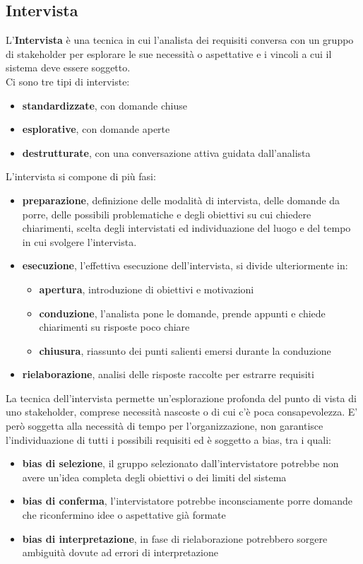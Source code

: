 \subsection{Intervista}\label{intervista}
L'\textbf{Intervista} è una tecnica in cui l'analista dei requisiti conversa con un gruppo di stakeholder per esplorare le sue necessità o aspettative e i vincoli a cui il sistema deve essere soggetto. \\
Ci sono tre tipi di interviste:
\begin{itemize}
    \item \textbf{standardizzate}, con domande chiuse
    \item \textbf{esplorative}, con domande aperte
    \item \textbf{destrutturate}, con una conversazione attiva guidata dall'analista
\end{itemize}
L'intervista si compone di più fasi:
\begin{itemize}
    \item \textbf{preparazione}, definizione delle modalità di intervista, delle domande da porre, delle possibili problematiche e degli obiettivi su cui chiedere chiarimenti, scelta degli intervistati ed individuazione del luogo e del tempo in cui svolgere l'intervista.
    \item \textbf{esecuzione}, l'effettiva esecuzione dell'intervista, si divide ulteriormente in:
    \begin{itemize}
        \item \textbf{apertura}, introduzione di obiettivi e motivazioni
        \item \textbf{conduzione}, l'analista pone le domande, prende appunti e chiede chiarimenti su risposte poco chiare
        \item \textbf{chiusura}, riassunto dei punti salienti emersi durante la conduzione
    \end{itemize}
    \item \textbf{rielaborazione}, analisi delle risposte raccolte per estrarre requisiti
\end{itemize}
La tecnica dell'intervista permette un'esplorazione profonda del punto di vista di uno stakeholder, comprese necessità nascoste o di cui c'è poca consapevolezza. E' però soggetta alla necessità di tempo per l'organizzazione, non garantisce l'individuazione di tutti i possibili requisiti ed è soggetto a bias, tra i quali:
\begin{itemize}
    \item \textbf{bias di selezione}, il gruppo selezionato dall'intervistatore potrebbe non avere un'idea completa degli obiettivi o dei limiti del sistema
    \item \textbf{bias di conferma}, l'intervistatore potrebbe inconsciamente porre domande che riconfermino idee o aspettative già formate
    \item \textbf{bias di interpretazione}, in fase di rielaborazione potrebbero sorgere ambiguità dovute ad errori di interpretazione
\end{itemize}
